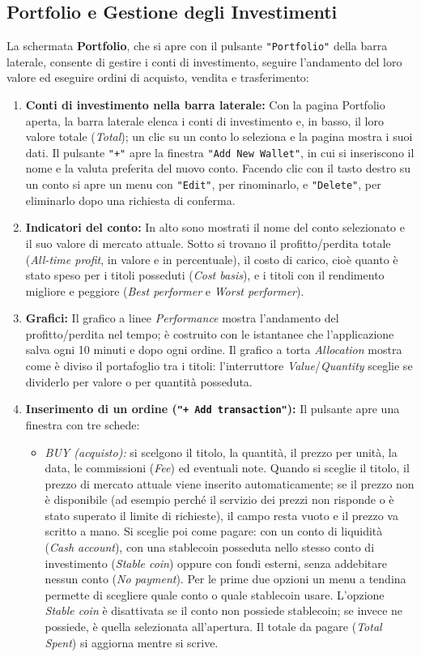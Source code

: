 \documentclass[11pt,a4paper,openright]{report}
\begin{document}
\subsection*{Portfolio e Gestione degli Investimenti}
La schermata \textbf{Portfolio}, che si apre con il pulsante \texttt{"Portfolio"} della barra laterale, consente di gestire i conti di investimento, seguire l'andamento del loro valore ed eseguire ordini di acquisto, vendita e trasferimento:
\begin{enumerate}
    \item \textbf{Conti di investimento nella barra laterale:} Con la pagina Portfolio aperta, la barra laterale elenca i conti di investimento e, in basso, il loro valore totale (\emph{Total}); un clic su un conto lo seleziona e la pagina mostra i suoi dati. Il pulsante \texttt{"+"} apre la finestra \texttt{"Add New Wallet"}, in cui si inseriscono il nome e la valuta preferita del nuovo conto. Facendo clic con il tasto destro su un conto si apre un menu con \texttt{"Edit"}, per rinominarlo, e \texttt{"Delete"}, per eliminarlo dopo una richiesta di conferma.
    \item \textbf{Indicatori del conto:} In alto sono mostrati il nome del conto selezionato e il suo valore di mercato attuale. Sotto si trovano il profitto/perdita totale (\emph{All-time profit}, in valore e in percentuale), il costo di carico, cioè quanto è stato speso per i titoli posseduti (\emph{Cost basis}), e i titoli con il rendimento migliore e peggiore (\emph{Best performer} e \emph{Worst performer}).
    \item \textbf{Grafici:} Il grafico a linee \emph{Performance} mostra l'andamento del profitto/perdita nel tempo; è costruito con le istantanee che l'applicazione salva ogni 10 minuti e dopo ogni ordine. Il grafico a torta \emph{Allocation} mostra come è diviso il portafoglio tra i titoli: l'interruttore \emph{Value}/\emph{Quantity} sceglie se dividerlo per valore o per quantità posseduta.
    \item \textbf{Inserimento di un ordine (\texttt{"+ Add transaction"}):} Il pulsante apre una finestra con tre schede:
    \begin{itemize}
        \item \emph{BUY (acquisto):} si scelgono il titolo, la quantità, il prezzo per unità, la data, le commissioni (\emph{Fee}) ed eventuali note. Quando si sceglie il titolo, il prezzo di mercato attuale viene inserito automaticamente; se il prezzo non è disponibile (ad esempio perché il servizio dei prezzi non risponde o è stato superato il limite di richieste), il campo resta vuoto e il prezzo va scritto a mano. Si sceglie poi come pagare: con un conto di liquidità (\emph{Cash account}), con una stablecoin posseduta nello stesso conto di investimento (\emph{Stable coin}) oppure con fondi esterni, senza addebitare nessun conto (\emph{No payment}). Per le prime due opzioni un menu a tendina permette di scegliere quale conto o quale stablecoin usare. L'opzione \emph{Stable coin} è disattivata se il conto non possiede stablecoin; se invece ne possiede, è quella selezionata all'apertura. Il totale da pagare (\emph{Total Spent}) si aggiorna mentre si scrive.

\end{itemize}
\end{enumerate}
\end{document}
